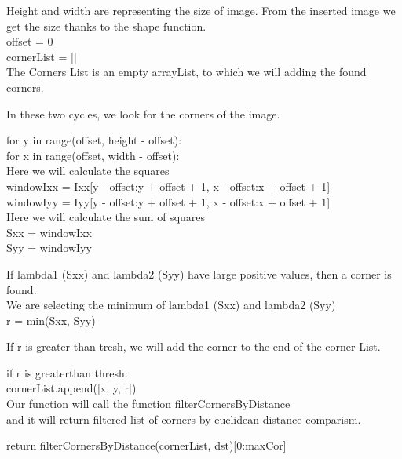 \documentclass{article}
\begin{document}
Height and width are representing the size of image. From the inserted image we get the size thanks to the shape function.\\

    offset = 0  \\

 cornerList = [] \\
 
 The Corners List is an empty arrayList, to which we will adding the found corners.
 
In these two cycles, we look for the corners of the image.\\\break 

   for y in range(offset, height - offset):\\ 
    \hspace{2cm}for x in range(offset, width - offset):\\\break
            Here we will calculate the squares \\\break
            windowIxx = Ixx[y - offset:y + offset + 1, x - offset:x + offset + 1]\\ \break
            windowIyy = Iyy[y - offset:y + offset + 1, x - offset:x + offset + 1]\\ \break
            Here we will calculate the sum of squares \\\break
            Sxx = \Sigma \hspace{0,1cm}  windowIxx\\ \break
            Syy = \Sigma \hspace{0,1cm} windowIyy\\ \break
            
             If lambda1 (Sxx) and lambda2 (Syy) have large positive
             values, then a corner is found.\\ \break
             We are selecting the minimum of lambda1 (Sxx) and lambda2 (Syy)\\ \break
             r = min(Sxx, Syy)\\\break
             
             If r is greater than tresh, we will add the corner to the end of the corner List.
             
            if \hspace{0,1cm} r \hspace{0,1cm}is\hspace{0,1cm} greater\hspace{0,1cm}than\hspace{0,1cm} thresh:\\
          
                cornerList.append([x, y, r])\\\break
    Our function will call the function filterCornersByDistance\\ 
    and it will return filtered list of corners by euclidean distance comparism.\\\break
    
     return filterCornersByDistance(cornerList, dst)[0:maxCor]
\end{document}
